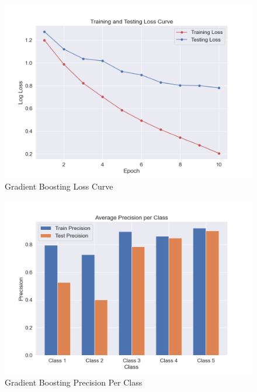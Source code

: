 \begin{figure}[H]
	\centering
	\includegraphics[width=\textwidth]{img/paper_1//loss_curve.png}
	\caption{Gradient Boosting Loss Curve}
\end{figure}

\begin{figure}[H]
	\centering
	\includegraphics[width=\textwidth]{img/paper_1//precision_per_class.png}
	\caption{Gradient Boosting Precision Per Class}
\end{figure}
